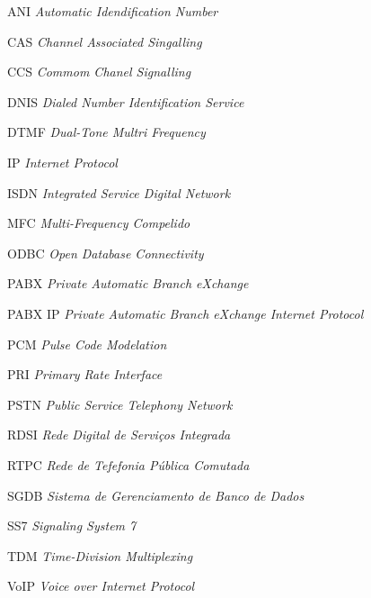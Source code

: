 \documentclass[12pt,openright,oneside,a4paper,brazil]{abntex2}
\begin{document}

\frenchspacing 







\listoffigures*
\cleardoublepage





\begin{siglas}
  \item[ANI]	 \textit{Automatic Idendification Number}
  \item[CAS]	 \textit{Channel Associated Singalling}
  \item[CCS]	 \textit{Commom Chanel Signalling}
  \item[DNIS]	 \textit{Dialed Number Identification Service}
  \item[DTMF]	 \textit{Dual-Tone Multri Frequency}
  \item[IP]		 \textit{Internet Protocol}
  \item[ISDN]	 \textit{Integrated Service Digital Network}
  \item[MFC]	 \textit{Multi-Frequency Compelido}
  \item[ODBC]	 \textit{Open Database Connectivity}
  \item[PABX]	 \textit{Private Automatic Branch eXchange}
  \item[PABX IP] \textit{Private Automatic Branch eXchange Internet Protocol}
  \item[PCM]	 \textit{Pulse Code Modelation}
  \item[PRI]	 \textit{Primary Rate Interface}
  \item[PSTN]	 \textit{Public Service Telephony Network}
  \item[RDSI]	 \textit{Rede Digital de Serviços Integrada}
  \item[RTPC]	 \textit{Rede de Tefefonia Pública Comutada}
  \item[SGDB]	 \textit{Sistema de Gerenciamento de Banco de Dados}
  \item[SS7]	 \textit{Signaling System 7}
  \item[TDM]	 \textit{Time-Division Multiplexing}
  \item[VoIP]	 \textit{Voice over Internet Protocol}
\end{siglas}
\end{document}
